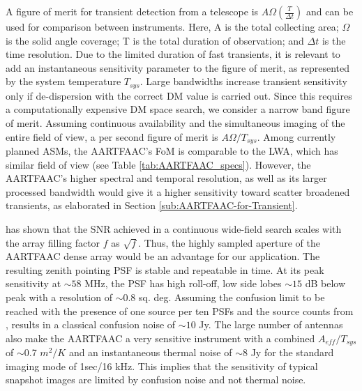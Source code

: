 \documentclass[referee]{aa}
\begin{document}
A  figure of  merit  for transient  detection  \citep{cordes2004dynamic} from  a
telescope  is  $A\Omega\left(\frac{T}{\Delta  t}\right)$  and can  be  used  for
comparison between instruments.  Here, A  is the total collecting area; $\Omega$
is the solid angle coverage; T is the total duration of observation; and $\Delta
t$ is the time resolution. Due to the limited duration of fast transients, it is
relevant to add  an instantaneous sensitivity parameter to  the figure of merit,
as represented  by the system temperature $T_{sys}$.   Large bandwidths increase
transient sensitivity only if de-dispersion with the correct DM value is carried
out.   Since this  requires  a  computationally expensive  DM  space search,  we
consider a narrow band figure of merit. Assuming continuous availability and the
simultaneous imaging of  the entire field of view, a per  second figure of merit
is  $A\Omega/T_{sys}$.  Among  currently  planned ASMs,  the  AARTFAAC's FoM  is
comparable  to   the  LWA,   which  has  similar   field  of  view   (see  Table
\ref{tab:AARTFAAC_specs}). However, the  AARTFAAC's higher spectral and temporal
resolution, as  well as its  larger processed bandwidth  would give it  a higher
sensitivity  toward  scatter broadened  transients,  as  elaborated in  Section
\ref{sub:AARTFAAC-for-Transient}.

\citet{backer1999pers}  has  shown  that   the  SNR  achieved  in  a  continuous
wide-field search scales with the  array filling factor $f$ as $\sqrt{f}$. Thus,
the highly  sampled aperture of the  AARTFAAC dense array would  be an advantage
for our application. The resulting  zenith pointing PSF is stable and repeatable
in time. At  its peak sensitivity at $\sim$$58$ MHz, the  PSF has high roll-off,
low side  lobes $\sim$$15$ dB  below peak with  a resolution of  $\sim$$0.8$ sq.
deg.  Assuming the confusion limit to be reached with the presence of one source
per ten PSFs and the  source counts from \citet{bregman2012system}, results in a
classical confusion noise  of $\sim$$10$ Jy.  The large  number of antennas also
make the AARTFAAC a very  sensitive instrument with a combined $A_{eff}/T_{sys}$
of  $\sim$0.7 $m^{2}/K$ \citep{wijnholds2011situ}  and an  instantaneous thermal
noise of $\sim$8 Jy for the  standard imaging mode of 1sec/16 kHz.  This implies
that the sensitivity  of typical snapshot images are  limited by confusion noise
and not thermal noise.
\end{document}
